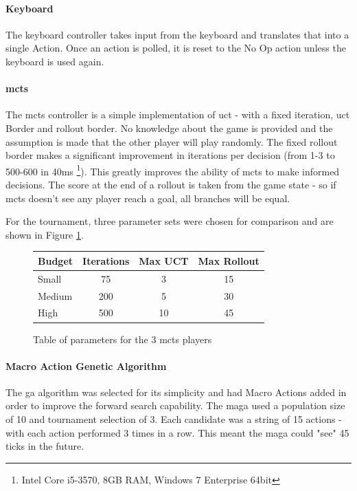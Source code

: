 \documentclass{IEEEtran}
\begin{document}
\paragraph{Keyboard}
The keyboard controller takes input from the keyboard and translates that into a single Action. Once an action is polled, it is reset to the No Op action unless the keyboard is used again. 
\paragraph{\gls{mcts}}
The \gls{mcts} controller is a simple implementation of \gls{uct} - with a fixed iteration, \gls{uct} Border and rollout border. No knowledge about the game is provided and the assumption is made that the other player will play randomly. The fixed rollout border makes a significant improvement in iterations per decision (from 1-3 to 500-600 in 40ms \footnote{Intel Core i5-3570, 8GB RAM, Windows 7 Enterprise 64bit}). This greatly improves the ability of \gls{mcts} to make informed decisions. The score at the end of a rollout is taken from the game state - so if \gls{mcts} doesn't see any player reach a goal, all branches will be equal.

For the tournament, three parameter sets were chosen for comparison and are shown in Figure \ref{mctsTable}.
\begin{figure}[h]
\centering
\begin{tabular}{| l | c | c | c |}
\hline
\textbf{Budget} & \textbf{Iterations} & \textbf{Max UCT} & \textbf{Max Rollout} \\
\hline
Small & 75 & 3 & 15 \\
Medium & 200 & 5 & 30 \\
High & 500 & 10 & 45 \\
\hline
\end{tabular}
\caption{Table of parameters for the 3 \gls{mcts} players}
\label{mctsTable}
\end{figure}

\paragraph{Macro Action Genetic Algorithm}
The \gls{ga} algorithm was selected for its simplicity and had Macro Actions added in order to improve the forward search capability. The \gls{maga} used a population size of 10 and tournament selection of 3. Each candidate was a string of 15 actions - with each action performed 3 times in a row. This meant the \gls{maga} could "see" 45 ticks in the future.
\end{document}
